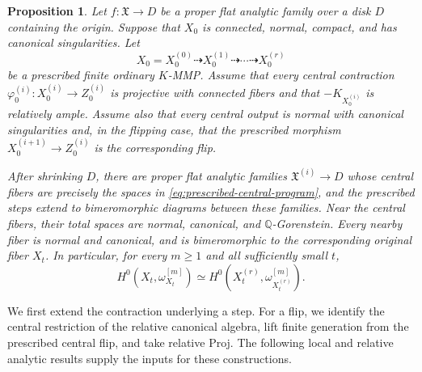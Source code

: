 \documentclass[11pt,a4paper]{article}
\newtheorem{proposition}[theorem]{Proposition}
\theoremstyle{definition}\newtheorem{definition}[theorem]{Definition}
\theoremstyle{remark}\newtheorem*{remark}{Remark}
\newcommand{\Q}{\mathbb Q}\newcommand{\C}{\mathbb C}
\begin{document}
\begin{proposition}\label{prop:finite-family}
Let $f:\mathfrak X\to D$ be a proper flat analytic family over a disk
$D$ containing the origin. Suppose that $X_0$ is connected, normal,
compact, and has canonical singularities. Let
\begin{equation}\label{eq:prescribed-central-program}
 X_0=X_0^{(0)}\dashrightarrow X_0^{(1)}
 \dashrightarrow\cdots\dashrightarrow X_0^{(r)}
\end{equation}
be a prescribed finite ordinary $K$-MMP. Assume that every
central contraction
$\varphi_0^{(i)}:X_0^{(i)}\to Z_0^{(i)}$ is projective with connected
fibers and that $-K_{X_0^{(i)}}$ is relatively ample. Assume also that
every central output is normal with canonical singularities and, in
the flipping case, that the prescribed morphism
$X_0^{(i+1)}\to Z_0^{(i)}$ is the corresponding flip.

After shrinking $D$, there are proper flat analytic families
$\mathfrak X^{(i)}\to D$ whose central fibers are precisely the spaces
in \eqref{eq:prescribed-central-program}, and the prescribed steps
extend to bimeromorphic diagrams between these families. Near the
central fibers, their total spaces are normal, canonical, and
$\Q$-Gorenstein. Every nearby fiber is normal and canonical, and is
bimeromorphic to the corresponding original fiber $X_t$. In
particular, for every $m\ge1$ and all sufficiently small $t$,
\begin{equation}\label{eq:family-birational-plurigenera}
 H^0(X_t,\omega_{X_t}^{[m]})
 \simeq H^0(X_t^{(r)},\omega_{X_t^{(r)}}^{[m]}).
\end{equation}
\end{proposition}

We first extend the contraction underlying a step. For a flip, we identify
the central restriction of the relative canonical algebra, lift finite
generation from the prescribed central flip, and take relative Proj.
The following local and relative analytic results supply the inputs for
these constructions.
\end{document}
